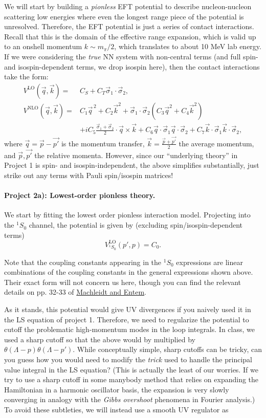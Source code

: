 \documentclass[%
oneside,                 %
final,                   %
10pt]{article}
\begin{document}
We will start by building a \emph{pionless} EFT potential to describe
nucleon-nucleon  scattering low energies where even the longest range piece of the
potential is unresolved.  Therefore, the EFT potential is just a
series of contact interactions. Recall that this is the domain of the
effective range expansion, which is valid up to an onshell momentum
$k\sim m_{\pi}/2$, which  translates to about 10 MeV lab energy. If we
were considering the \emph{true} NN system with non-central terms (and full
spin- and isospin-dependent terms, we drop isospin here), then the contact interactions take
the form: 
\begin{align*}
V^\mathrm{LO}(\vec{q},\vec{k})=&C_S+C_T\vec{\sigma}_1\cdot\vec{\sigma}_2,\\
V^\mathrm{NLO}(\vec{q},\vec{k})=&C_1\vec{q}^{\,2}+C_2\vec{k}^2+
\vec{\sigma}_1\cdot\vec{\sigma}_2\left(C_3\vec{q}^2+C_4\vec{k}^2\right)\\
&+iC_5\frac{\vec{\sigma}_1+\vec{\sigma}_2}{2}\cdot\vec{q}\times\vec{k}+C_6\vec{q}\cdot\vec{\sigma}_1\vec{q}\cdot\vec{\sigma}_2
+C_7\vec{k}\cdot\vec{\sigma}_1\vec{k}\cdot\vec{\sigma}_2, 
\end{align*}
where $\vec{q}=\vec{p}-\vec{p'}$ is the momentum transfer,
$\vec{k}=\frac{\vec{p}+\vec{p'}}{2}$ the average momentum, and
$\vec{p},\vec{p'}$ the relative momenta.  However, since our
``underlying theory'' in Project 1 is spin- and isospin-independent,
the above simplifies substantially, just strike out any terms with
Pauli spin/isospin matrices!




\paragraph{Project 2a): Lowest-order pionless theory.}
We start by fitting the lowest order pionless interaction model. Projecting into the $^1S_0$ channel, the potential is given by (excluding spin/isospin-dependent terms)
\[
V^\mathrm{LO}_{^1S_0}(p',p)=C_0.
\]

Note that the coupling constants appearing in the $^1S_0$
expressions are linear combinations of the coupling constants in the
general expressions shown above. Their exact form will not concern us here,
though you can find the relevant details on pp. 32-33 of \href{{https://arxiv.org/abs/1105.2919}}{Machleidt and Entem}.

As it stands, this potential would give UV
divergences if you naively used it in the LS equation of project 1. Therefore, we
need to regularize the potential to cutoff the problematic
high-momentum modes in the loop integrals. In class, we used a sharp
cutoff so that the above would by multiplied by $\theta(\Lambda -
p)\theta(\Lambda-p')$. While conceptually simple, sharp cutoffs can be
tricky, can you guess how you would need to modify the \emph{trick} used
to handle the principal value integral in the LS equation? (This is
actually the least of our worries. If we try to use a sharp cutoff in
some manybody method that relies on expanding the Hamiltonian in a
harmonic oscillator basis, the expansion is very slowly converging in
analogy with the \emph{Gibbs overshoot} phenomena in Fourier analysis.) To
avoid these subtleties, we will instead use a smooth UV regulator as
\end{document}
